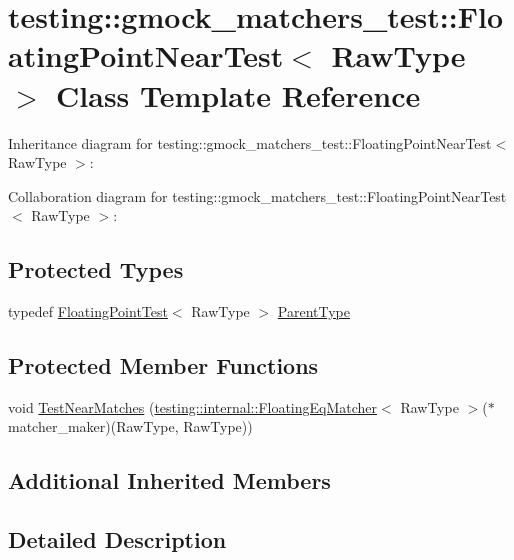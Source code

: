 \hypertarget{classtesting_1_1gmock__matchers__test_1_1_floating_point_near_test}{}\section{testing\+:\+:gmock\+\_\+matchers\+\_\+test\+:\+:Floating\+Point\+Near\+Test$<$ Raw\+Type $>$ Class Template Reference}
\label{classtesting_1_1gmock__matchers__test_1_1_floating_point_near_test}


Inheritance diagram for testing\+:\+:gmock\+\_\+matchers\+\_\+test\+:\+:Floating\+Point\+Near\+Test$<$ Raw\+Type $>$\+:


Collaboration diagram for testing\+:\+:gmock\+\_\+matchers\+\_\+test\+:\+:Floating\+Point\+Near\+Test$<$ Raw\+Type $>$\+:
\subsection*{Protected Types}
\begin{DoxyCompactItemize}
\item 
typedef \hyperlink{classtesting_1_1gmock__matchers__test_1_1_floating_point_test}{Floating\+Point\+Test}$<$ Raw\+Type $>$ \hyperlink{classtesting_1_1gmock__matchers__test_1_1_floating_point_near_test_ac767d2bf3e518d1e7cf9dfafc76cc53a}{Parent\+Type}
\end{DoxyCompactItemize}
\subsection*{Protected Member Functions}
\begin{DoxyCompactItemize}
\item 
void \hyperlink{classtesting_1_1gmock__matchers__test_1_1_floating_point_near_test_a712b564197ab76f58d345c5e3e73955d}{Test\+Near\+Matches} (\hyperlink{classtesting_1_1internal_1_1_floating_eq_matcher}{testing\+::internal\+::\+Floating\+Eq\+Matcher}$<$ Raw\+Type $>$($\ast$matcher\+\_\+maker)(Raw\+Type, Raw\+Type))
\end{DoxyCompactItemize}
\subsection*{Additional Inherited Members}


\subsection{Detailed Description}
